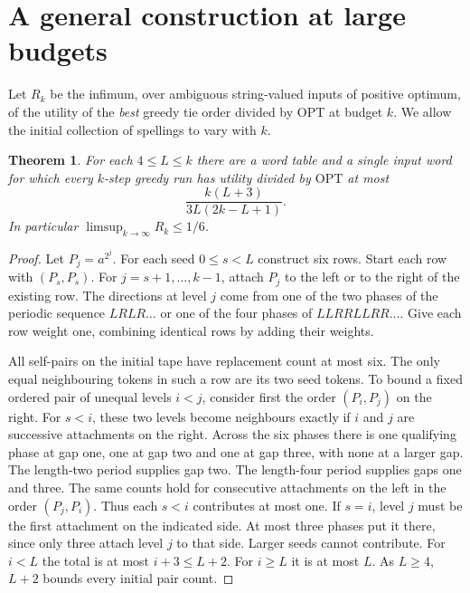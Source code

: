 \documentclass[11pt]{article}
\newtheorem{theorem}{Theorem}
\newcommand{\OPT}{\mathrm{OPT}}
\begin{document}
\section{A general construction at large budgets}
Let $R_k$ be the infimum, over ambiguous string-valued inputs of positive optimum, of the utility of the \emph{best} greedy tie order divided by $\OPT$ at budget $k$. We allow the initial collection of spellings to vary with $k$.
\begin{theorem}\label{th:family}
For each $4\le L\le k$ there are a word table and a single input word for which every $k$-step greedy run has utility divided by $\OPT$ at most
\[
\frac{k(L+3)}{3L(2k-L+1)}.
\]
In particular $\limsup_{k\to\infty}R_k\le1/6$.
\end{theorem}
\begin{proof}
Let $P_j=a^{2^j}$. For each seed $0\le s<L$ construct six rows. Start each row with $(P_s,P_s)$. For $j=s+1,\ldots,k-1$, attach $P_j$ to the left or to the right of the existing row. The directions at level $j$ come from one of the two phases of the periodic sequence $LRLR\ldots$ or one of the four phases of $LLRRLLRR\ldots$. Give each row weight one, combining identical rows by adding their weights.

All self-pairs on the initial tape have replacement count at most six. The only equal neighbouring tokens in such a row are its two seed tokens. To bound a fixed ordered pair of unequal levels $i<j$, consider first the order $(P_i,P_j)$ on the right. For $s<i$, these two levels become neighbours exactly if $i$ and $j$ are successive attachments on the right. Across the six phases there is one qualifying phase at gap one, one at gap two and one at gap three, with none at a larger gap. The length-two period supplies gap two. The length-four period supplies gaps one and three. The same counts hold for consecutive attachments on the left in the order $(P_j,P_i)$. Thus each $s<i$ contributes at most one. If $s=i$, level $j$ must be the first attachment on the indicated side. At most three phases put it there, since only three attach level $j$ to that side. Larger seeds cannot contribute. For $i<L$ the total is at most $i+3\le L+2$. For $i\ge L$ it is at most $L$. As $L\ge4$, $L+2$ bounds every initial pair count.


\end{proof}
\end{document}
